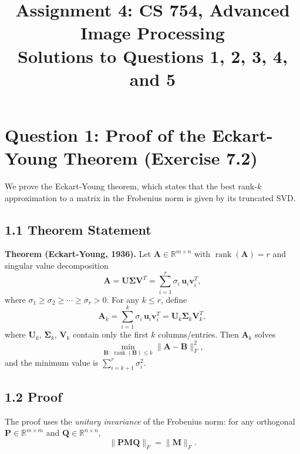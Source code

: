 \documentclass[11pt]{article}
\title{Assignment 4: CS 754, Advanced Image Processing\\
\large Solutions to Questions 1, 2, 3, 4, and 5}
\author{}
\date{}
\begin{document}
\maketitle

\section*{Question 1: Proof of the Eckart-Young Theorem (Exercise 7.2)}

We prove the Eckart-Young theorem, which states that the best rank-$k$
approximation to a matrix in the Frobenius norm is given by its truncated SVD.

\subsection*{1.1 Theorem Statement}

\textbf{Theorem (Eckart-Young, 1936).}
Let $\boldsymbol{A} \in \mathbb{R}^{m \times n}$ with $\operatorname{rank}(\boldsymbol{A}) = r$
and singular value decomposition
\[
\boldsymbol{A} = \boldsymbol{U}\boldsymbol{\Sigma}\boldsymbol{V}^T
= \sum_{i=1}^{r} \sigma_i \,\boldsymbol{u}_i \boldsymbol{v}_i^T,
\]
where $\sigma_1 \geq \sigma_2 \geq \cdots \geq \sigma_r > 0$.
For any $k \leq r$, define
\[
\boldsymbol{A}_k = \sum_{i=1}^{k} \sigma_i \,\boldsymbol{u}_i \boldsymbol{v}_i^T
= \boldsymbol{U}_k \boldsymbol{\Sigma}_k \boldsymbol{V}_k^T,
\]
where $\boldsymbol{U}_k$, $\boldsymbol{\Sigma}_k$, $\boldsymbol{V}_k$ contain only
the first $k$ columns/entries. Then $\boldsymbol{A}_k$ solves
\[
\min_{\boldsymbol{B}:\;\operatorname{rank}(\boldsymbol{B})\leq k}
\|\boldsymbol{A} - \boldsymbol{B}\|_F^2,
\]
and the minimum value is $\sum_{i=k+1}^{r}\sigma_i^2$.

\subsection*{1.2 Proof}

The proof uses the \emph{unitary invariance} of the Frobenius norm:
for any orthogonal $\boldsymbol{P} \in \mathbb{R}^{m \times m}$ and
$\boldsymbol{Q} \in \mathbb{R}^{n \times n}$,
\[
\|\boldsymbol{P}\boldsymbol{M}\boldsymbol{Q}\|_F = \|\boldsymbol{M}\|_F.
\]
\end{document}

